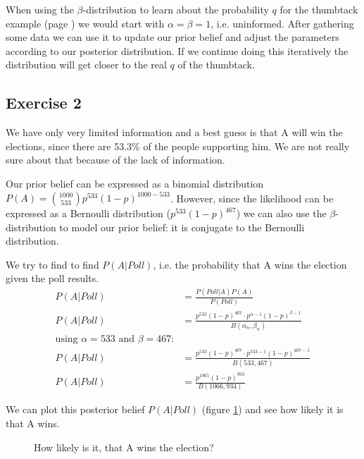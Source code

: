 \bigskip

When using the $\beta$-distribution to learn about the probability $q$ for the thumbtack example (page \pageref{example:Thumbtack Toss}) we would start with $\alpha=\beta=1$, i.e. uninformed. After gathering some data we can use it to update our prior belief and adjust the parameters according to our posterior distribution. If we continue doing this iteratively the distribution will get closer to the real $q$ of the thumbtack.


\subsection*{Exercise 2}
We have only very limited information and a best guess is that A will win the elections, since there are 53.3\% of the people supporting him. We are not really sure about that because of the lack of information.

Our prior belief can be expressed as a binomial distribution $P(A) = \binom{1000}{533} p^{533}(1-p)^{1000-533}$. However, since the likelihood can be expressed as a Bernoulli distribution ($p^{533}(1-p)^{467}$) we can also use the $\beta$-distribution to model our prior belief: it is conjugate to the Bernoulli distribution. 

We try to find to find $P(A|Poll)$, i.e. the probability that A wins the election given the poll results.
\begin{align*}
P(A|Poll) &= \frac{P(Poll|A)P(A)}{P(Poll)}\\
P(A|Poll) &= \frac{p^{533}(1-p)^{467} \cdot p^{\alpha-1}(1-p)^{\beta-1}}{B(\alpha_n,\beta_n)}\\
\text{using $\alpha=533$ and $\beta=467$:}\\
P(A|Poll) &= \frac{p^{533}(1-p)^{467} \cdot p^{533-1}(1-p)^{467-1}}{B(533,467)}\\
P(A|Poll) &= \frac{p^{1065}(1-p)^{933}}{B(1066,934)}
\end{align*}

We can plot this posterior belief $P(A|Poll)$ (figure \ref{fig:2014-05-30_ex2plot}) and see how likely it is that A wins.
\begin{figure}[!ht]
\centering
{}
\caption{How likely is it, that A wins the election?}
\label{fig:2014-05-30_ex2plot}
\end{figure}


